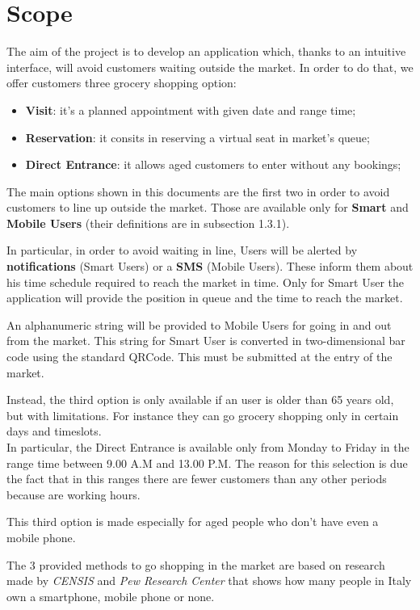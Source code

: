  
\section{Scope}

The aim of the project is to develop an application which, thanks to an intuitive interface, will avoid customers waiting outside the market.
In order to do that, we offer customers three grocery shopping option: 

\begin{itemize}
\item \textbf{Visit}: it's a planned appointment with given date and range time;
\item \textbf{Reservation}: it consits in reserving a virtual seat in market's queue;
\item \textbf{Direct Entrance}: it allows aged customers to enter without any bookings;
\end{itemize}
\bigskip
The main options shown in this documents are the first two in order to avoid customers to line up outside the market. Those are available only for \textbf{Smart} and \textbf{Mobile Users} (their definitions are in subsection 1.3.1).\par
In particular, in order to avoid waiting in line, Users will be alerted by \textbf{notifications} (Smart Users) or a \textbf{SMS} (Mobile Users). These inform them about his time schedule required to reach the market in time.
Only for Smart User the application will provide the position in queue and the time to reach the market.\par
An alphanumeric string will be provided to Mobile Users for going in and out from the market. This string for Smart User is converted in two-dimensional bar code using the standard QRCode. This must be submitted at the entry of the market.\par
Instead, the third option is only available if an user is older than 65 years old, but with limitations. For instance they can go grocery shopping only in certain days and timeslots. \\
In particular, the Direct Entrance is available only from Monday to Friday in the range time between 9.00 A.M and 13.00 P.M. The reason for this selection is due the fact that in this ranges there are fewer customers than any other periods because are working hours. \par
This third option is made especially for aged people who don't have even a mobile phone. \par
The 3 provided methods to go shopping in the market are based on research made by \textit{CENSIS} and \textit{Pew Research Center} that shows how many people in Italy own a smartphone, mobile phone or none.\\
